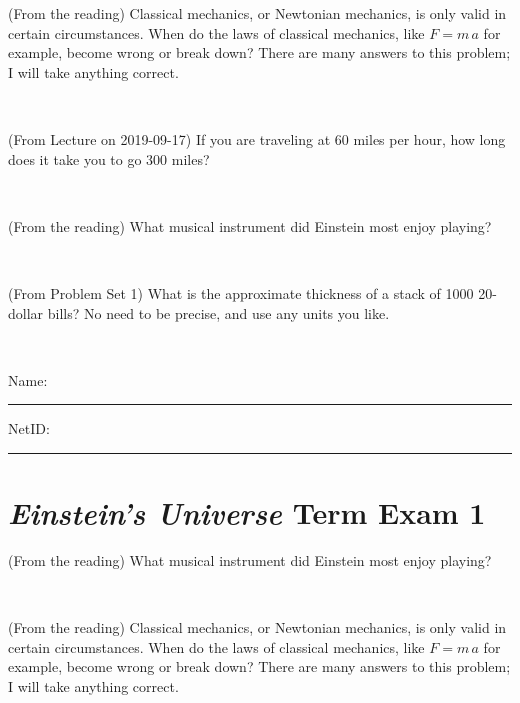 \documentclass[12pt, letterpaper]{article}
\begin{document}
\begin{problem} (From the reading)
Classical mechanics, or Newtonian mechanics, is only valid in certain
circumstances. When do the laws of classical mechanics, like $F =
m\,a$ for example, become wrong or break down? There are many answers
to this problem; I will take anything correct.
\end{problem}


\vfill ~

\begin{problem} (From Lecture on 2019-09-17)
If you are traveling at 60 miles per hour, how long does
it take you to go 300 miles?
\end{problem}


\vfill ~

\begin{problem} (From the reading)
What musical instrument did Einstein most enjoy playing?
\end{problem}


\vfill ~

\begin{problem} (From Problem Set 1)
What is the approximate thickness of a stack of 1000 20-dollar bills?
No need to be precise, and use any units you like.
\end{problem}


\vfill ~


\cleardoublepage



\noindent
Name: \rule[-1ex]{0.60\textwidth}{0.1pt}
NetID: \rule[-1ex]{0.20\textwidth}{0.1pt}

\section*{\textsl{Einstein's Universe} Term Exam 1}
\setcounter{problem}{1}


\begin{problem} (From the reading)
What musical instrument did Einstein most enjoy playing?
\end{problem}


\vfill ~

\begin{problem} (From the reading)
Classical mechanics, or Newtonian mechanics, is only valid in certain
circumstances. When do the laws of classical mechanics, like $F =
m\,a$ for example, become wrong or break down? There are many answers
to this problem; I will take anything correct.
\end{problem}
\end{document}

